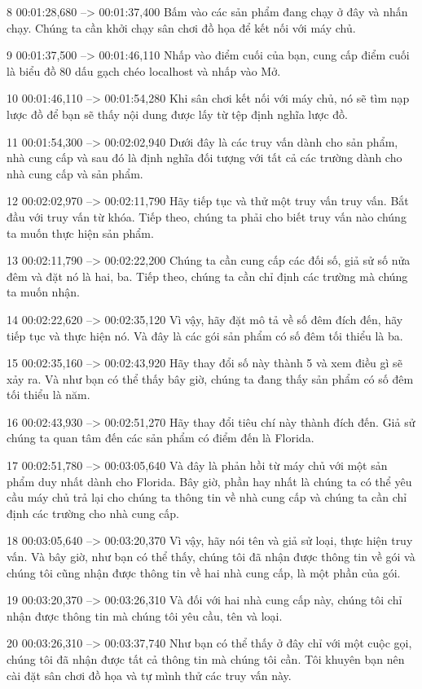 8
00:01:28,680 --> 00:01:37,400
Bấm vào các sản phẩm đang chạy ở đây và nhấn chạy.  Chúng ta cần khởi chạy sân chơi đồ họa để kết nối với máy chủ.

9
00:01:37,500 --> 00:01:46,110
Nhấp vào điểm cuối của bạn, cung cấp điểm cuối là biểu đồ 80 dấu gạch chéo localhost và nhấp vào Mở.

10
00:01:46,110 --> 00:01:54,280
Khi sân chơi kết nối với máy chủ, nó sẽ tìm nạp lược đồ để bạn sẽ thấy nội dung được lấy từ tệp định nghĩa lược đồ.

11
00:01:54,300 --> 00:02:02,940
Dưới đây là các truy vấn dành cho sản phẩm, nhà cung cấp và sau đó là định nghĩa đối tượng với tất cả các trường dành cho nhà cung cấp và sản phẩm.

12
00:02:02,970 --> 00:02:11,790
Hãy tiếp tục và thử một truy vấn truy vấn.  Bắt đầu với truy vấn từ khóa.  Tiếp theo, chúng ta phải cho biết truy vấn nào chúng ta muốn thực hiện sản phẩm.

13
00:02:11,790 --> 00:02:22,200
Chúng ta cần cung cấp các đối số, giả sử số nửa đêm và đặt nó là hai, ba.  Tiếp theo, chúng ta cần chỉ định các trường mà chúng ta muốn nhận.

14
00:02:22,620 --> 00:02:35,120
Vì vậy, hãy đặt mô tả về số đêm đích đến, hãy tiếp tục và thực hiện nó.  Và đây là các gói sản phẩm có số đêm tối thiểu là ba.

15
00:02:35,160 --> 00:02:43,920
Hãy thay đổi số này thành 5 và xem điều gì sẽ xảy ra.  Và như bạn có thể thấy bây giờ, chúng ta đang thấy sản phẩm có số đêm tối thiểu là năm.

16
00:02:43,930 --> 00:02:51,270
Hãy thay đổi tiêu chí này thành đích đến.  Giả sử chúng ta quan tâm đến các sản phẩm có điểm đến là Florida.

17
00:02:51,780 --> 00:03:05,640
Và đây là phản hồi từ máy chủ với một sản phẩm duy nhất dành cho Florida.  Bây giờ, phần hay nhất là chúng ta có thể yêu cầu máy chủ trả lại cho chúng ta thông tin về nhà cung cấp và chúng ta cần chỉ định các trường cho nhà cung cấp.

18
00:03:05,640 --> 00:03:20,370
Vì vậy, hãy nói tên và giả sử loại, thực hiện truy vấn.  Và bây giờ, như bạn có thể thấy, chúng tôi đã nhận được thông tin về gói và chúng tôi cũng nhận được thông tin về hai nhà cung cấp, là một phần của gói.

19
00:03:20,370 --> 00:03:26,310
Và đối với hai nhà cung cấp này, chúng tôi chỉ nhận được thông tin mà chúng tôi yêu cầu, tên và loại.

20
00:03:26,310 --> 00:03:37,740
Như bạn có thể thấy ở đây chỉ với một cuộc gọi, chúng tôi đã nhận được tất cả thông tin mà chúng tôi cần.  Tôi khuyên bạn nên cài đặt sân chơi đồ họa và tự mình thử các truy vấn này.

